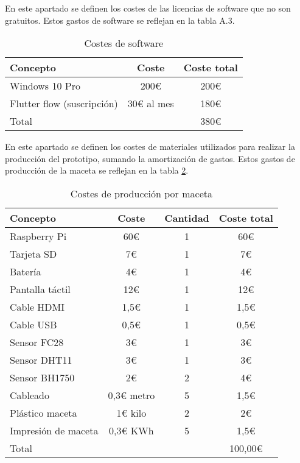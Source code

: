             En este apartado se definen los costes de las licencias de software que no son gratuitos. Estos gastos de software se reflejan en la tabla A.3.
            \begin{table}[H]
                \centering
                \caption{Costes de software}
                \begin{tabular}{|l|c|c|}
                    \hline
                    Concepto & Coste & Coste total \\
                    \hline
                    Windows 10 Pro & 200€ & 200€ \\
                    Flutter flow (suscripción) & 30€ al mes & 180€ \\
                    \hline
                    Total &  & 380€ \\
                    \hline
                \end{tabular}
                \label{tab:costes de software de desarrollo inicial}
            \end{table}
            En este apartado se definen los costes de materiales utilizados para realizar la producción del prototipo, sumando la amortización de gastos. Estos gastos de producción de la maceta se reflejan en la tabla \ref{tab:costes de producción de prototipo de desarrollo inicial}.
            \begin{table}[H]
                \centering
                \caption{Costes de producción por maceta}
                \begin{tabular}{|l|c|c|c|}
                    \hline
                    Concepto & Coste & Cantidad & Coste total \\
                    \hline
                    Raspberry Pi & 60€ & 1 & 60€ \\
                    Tarjeta SD & 7€ & 1 & 7€ \\
                    Batería & 4€ & 1 & 4€ \\
                    Pantalla táctil & 12€ & 1 & 12€ \\
                    Cable HDMI & 1,5€ & 1 & 1,5€ \\
                    Cable USB & 0,5€ & 1 & 0,5€ \\
                    Sensor FC28 & 3€ & 1 & 3€ \\
                    Sensor DHT11 & 3€ & 1 & 3€ \\
                    Sensor BH1750 & 2€ & 2 & 4€ \\
                    Cableado & 0,3€ metro & 5 & 1,5€ \\
                    Plástico maceta & 1€ kilo & 2 & 2€ \\
                    Impresión de maceta & 0,3€ KWh & 5 & 1,5€ \\
                    \hline
                    Total & & & 100,00€ \\
                    \end{tabular}
                    \label{tab:costes de producción de prototipo de desarrollo inicial}
                \end{table}
